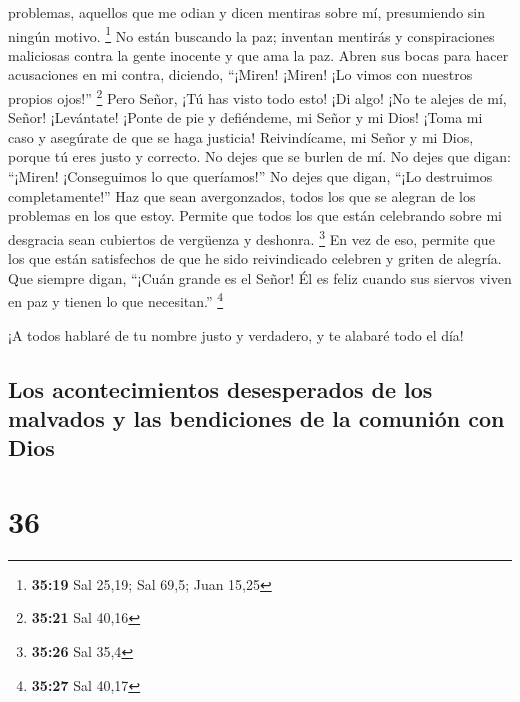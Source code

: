 problemas, aquellos que me odian y dicen mentiras sobre mí, presumiendo
sin ningún motivo. \footnote{\textbf{35:19} Sal 25,19; Sal 69,5; Juan
  15,25}  No están buscando la paz; inventan mentirás y
conspiraciones maliciosas contra la gente inocente y que ama la paz.
 Abren sus bocas para hacer acusaciones en mi contra,
diciendo, ``¡Miren! ¡Miren! ¡Lo vimos con nuestros propios ojos!''
\footnote{\textbf{35:21} Sal 40,16}  Pero Señor, ¡Tú has
visto todo esto! ¡Di algo! ¡No te alejes de mí, Señor! 
¡Levántate! ¡Ponte de pie y defiéndeme, mi Señor y mi Dios! ¡Toma mi
caso y asegúrate de que se haga justicia!  Reivindícame, mi
Señor y mi Dios, porque tú eres justo y correcto. No dejes que se burlen
de mí.  No dejes que digan: ``¡Miren! ¡Conseguimos lo que
queríamos!'' No dejes que digan, ``¡Lo destruimos completamente!''
 Haz que sean avergonzados, todos los que se alegran de los
problemas en los que estoy. Permite que todos los que están celebrando
sobre mi desgracia sean cubiertos de vergüenza y deshonra. \footnote{\textbf{35:26}
  Sal 35,4}  En vez de eso, permite que los que están
satisfechos de que he sido reivindicado celebren y griten de alegría.
Que siempre digan, ``¡Cuán grande es el Señor! Él es feliz cuando sus
siervos viven en paz y tienen lo que necesitan.'' \footnote{\textbf{35:27}
  Sal 40,17}

 ¡A todos hablaré de tu nombre justo y verdadero, y te
alabaré todo el día!

\hypertarget{los-acontecimientos-desesperados-de-los-malvados-y-las-bendiciones-de-la-comuniuxf3n-con-dios}{%
\subsection{Los acontecimientos desesperados de los malvados y las
bendiciones de la comunión con
Dios}\label{los-acontecimientos-desesperados-de-los-malvados-y-las-bendiciones-de-la-comuniuxf3n-con-dios}}

\hypertarget{section-35}{%
\section{36}\label{section-35}}

